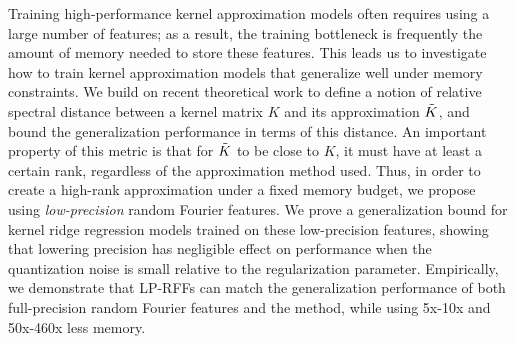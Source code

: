 
Training high-performance kernel approximation models often requires using a large number of features; as a result, the training bottleneck is frequently the amount of memory needed to store these features. This leads us to investigate how to train kernel approximation models that generalize well under memory constraints. We build on recent theoretical work to define a notion of relative spectral distance between a kernel matrix $K$ and its approximation $\tilde{K}$, and bound the generalization performance in terms of this distance. An important property of this metric is that for $\tilde{K}$ to be close to $K$, it must have at least a certain rank, regardless of the approximation method used. Thus, in order to create a high-rank approximation under a fixed memory budget, we propose using \emph{low-precision} random Fourier features. We prove a generalization bound for kernel ridge regression models trained on these low-precision features, showing that lowering precision has negligible effect on performance when the quantization noise is small relative to the regularization parameter. Empirically, we demonstrate that LP-RFFs can match the generalization performance of both full-precision random Fourier features and the \Nystrom method, while using 5x-10x and 50x-460x less memory.


